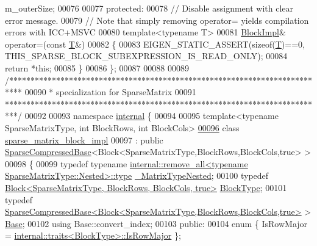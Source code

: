 \begin{DoxyCode}
      m\_outerSize;
00076 
00077   \textcolor{keyword}{protected}:
00078     \textcolor{comment}{// Disable assignment with clear error message.}
00079     \textcolor{comment}{// Note that simply removing operator= yields compilation errors with ICC+MSVC}
00080     \textcolor{keyword}{template}<\textcolor{keyword}{typename} T>
00081     \hyperlink{class_eigen_1_1_block_impl}{BlockImpl}& operator=(\textcolor{keyword}{const} \hyperlink{group___sparse_core___module}{T}&)
00082     \{
00083       EIGEN\_STATIC\_ASSERT(\textcolor{keyword}{sizeof}(\hyperlink{group___sparse_core___module}{T})==0, THIS\_SPARSE\_BLOCK\_SUBEXPRESSION\_IS\_READ\_ONLY);
00084       \textcolor{keywordflow}{return} *\textcolor{keyword}{this};
00085     \}
00086 \};
00087 
00088 
00089 \textcolor{comment}{/***************************************************************************}
00090 \textcolor{comment}{* specialization for SparseMatrix}
00091 \textcolor{comment}{***************************************************************************/}
00092 
00093 \textcolor{keyword}{namespace }\hyperlink{namespaceinternal}{internal} \{
00094 
00095 \textcolor{keyword}{template}<\textcolor{keyword}{typename} SparseMatrixType, \textcolor{keywordtype}{int} BlockRows, \textcolor{keywordtype}{int} BlockCols>
\hyperlink{class_eigen_1_1internal_1_1sparse__matrix__block__impl}{00096} \textcolor{keyword}{class }\hyperlink{class_eigen_1_1internal_1_1sparse__matrix__block__impl}{sparse\_matrix\_block\_impl}
00097   : \textcolor{keyword}{public} \hyperlink{group___sparse_core___module_class_eigen_1_1_sparse_compressed_base}{SparseCompressedBase}<Block<SparseMatrixType,BlockRows,BlockCols,true> >
00098 \{
00099     \textcolor{keyword}{typedef} \textcolor{keyword}{typename} 
      \hyperlink{group___sparse_core___module}{internal::remove\_all<typename SparseMatrixType::Nested>::type}
       \hyperlink{group___sparse_core___module}{\_MatrixTypeNested};
00100     \textcolor{keyword}{typedef} \hyperlink{group___core___module_class_eigen_1_1_block}{Block<SparseMatrixType, BlockRows, BlockCols, true>}
       \hyperlink{group___core___module_class_eigen_1_1_block}{BlockType};
00101     \textcolor{keyword}{typedef} 
      \hyperlink{group___sparse_core___module_class_eigen_1_1_sparse_compressed_base}{SparseCompressedBase<Block<SparseMatrixType,BlockRows,BlockCols,true>}
       > \hyperlink{group___sparse_core___module}{Base};
00102     \textcolor{keyword}{using} Base::convert\_index;
00103 \textcolor{keyword}{public}:
00104     \textcolor{keyword}{enum} \{ IsRowMajor = \hyperlink{struct_eigen_1_1internal_1_1traits}{internal::traits<BlockType>::IsRowMajor} \};

\end{DoxyCode}
